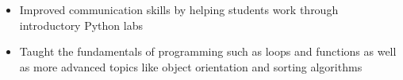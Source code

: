 \documentclass[letterpaper,14pt]{extarticle}
\begin{document}
  \begin{itemize}[itemsep=0pt, topsep=2pt]
    \item{Improved communication skills by helping students work through introductory Python labs}
    \item{Taught the fundamentals of programming such as loops and functions as well as more advanced topics like object orientation and sorting algorithms}
  \end{itemize}
\end{document}
